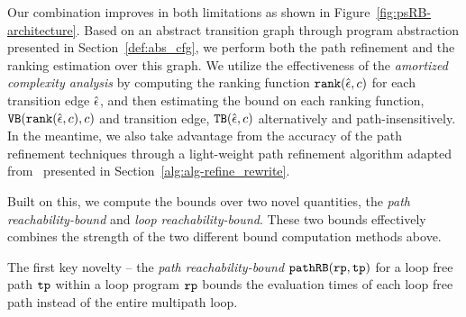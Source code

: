 Our combination improves in both limitations as shown in Figure~\ref{fig:psRB-architecture}.
Based on an abstract transition graph through program abstraction presented in Section~\ref{def:abs_cfg},
we perform both the path refinement and the ranking estimation over this graph.
We utilize the effectiveness of the \emph{amortized complexity analysis} by computing the ranking function $\mathtt{rank}(\hat{\mathtt{\epsilon}{}}, c)$ for each transition edge $\hat{\mathtt{\epsilon}{}}$, and then estimating the bound on each ranking function, ${\mathtt{VB}}(\mathtt{rank}(\hat{\mathtt{\epsilon}{}}, c), c)$ and transition edge, ${\mathtt{TB}}(\hat{\mathtt{\epsilon}{}}, c)$ alternatively and path-insensitively.
In the meantime, we also take advantage from the accuracy of the path refinement techniques through a light-weight path refinement algorithm adapted from~\cite{GulwaniJK09} presented in Section~\ref{alg:alg-refine_rewrite}.

Built on this, we compute the bounds over two novel quantities, the \emph{path reachability-bound} and \emph{loop reachability-bound}. These two bounds effectively combines the strength of the two different bound computation methods above.

The first key novelty -- the \emph{path reachability-bound} $\mathtt{pathRB}(\mathtt{rp}, \mathtt{tp})$ for a loop free path $\mathtt{tp}$ within a loop program $\mathtt{rp}$ bounds the evaluation times of each loop free path instead of the entire multipath loop.

